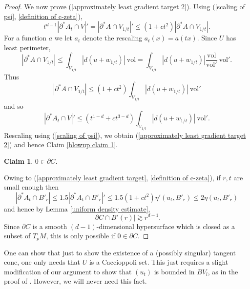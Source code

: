\documentclass[reqno,12pt,letterpaper]{amsart}
\newcommand{\vol}{\mathrm{vol}}
\newtheorem{claim}[theorem]{Claim}
\theoremstyle{definition}
\numberwithin{equation}{section}
\begin{document}
\begin{proof}
We now prove (\ref{approximately least gradient target 2}).
Using (\ref{scaling of psi}, \ref{definition of c-zeta}),
$$t^{d - 1} | \partial^* A_t \cap V|' = |\partial^* A \cap V_{1/t}|' \leq (1 + ct^2) |\partial^* A \cap V_{1/t}|.$$
For a function $a$ we let $a_t$ denote the rescaling $a_t(x) = a(tx)$.
Since $U$ has least perimeter,
$$|\partial^* A \cap V_{1/t}| \leq \int_{V_{1/t}} |d(u + w_{1/t})| ~\vol = \int_{V_{1/t}} |d(u + w_{1/t})| \frac{\vol}{\vol'} ~\vol'.$$
Thus
$$|\partial^* A \cap V_{1/t}| \leq (1 + ct^2) \int_{V_{1/t}} |d(u + w_{1/t})| ~\vol'$$
and so
$$|\partial^* A_t \cap V|' \leq (t^{1 - d} + ct^{3 - d}) \int_{V_{1/t}} |d(u + w_{1/t})| ~\vol'.$$
Rescaling using (\ref{scaling of psi}), we obtain (\ref{approximately least gradient target 2}) and hence Claim \ref{blowup claim 1}.

\begin{claim}
$0 \in \partial C$.
\end{claim}

Owing to (\ref{approximately least gradient target}, \ref{definition of c-zeta}), if $r,t$ are small enough then
$$|\partial^* A_t \cap B'_r| \leq 1.5|\partial^* A_t \cap B'_r|' \leq 1.5(1 + ct^2) \eta'(u_t, B'_r) \leq 2 \eta(u_t, B'_r)$$
and hence by Lemma \ref{uniform density estimate},
$$|\partial C \cap B'(r)| \gtrsim r^{d - 1}.$$
Since $\partial C$ is a smooth $(d-1)$-dimensional hypersurface which is closed as a subset of $T_pM$, this is only possible if $0 \in \partial C$.
\end{proof}

One can show that just to show the existence of a (possibly singular) tangent cone, one only needs that $U$ is a Caccioppoli set.
This just requires a slight modification of our argument to show that $(u_t)$ is bounded in $BV_l$, as in the proof of \cite[Theorem 9.3]{Giusti77}.
However, we will never need this fact.
\end{document}
